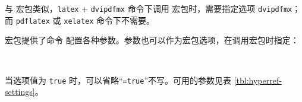 与  宏包类似，\texttt{latex} + \texttt{dvipdfmx} 命令下调用  宏包时，需要指定选项 \texttt{dvipdfmx}；
而 \texttt{pdflatex} 或 \texttt{xelatex} 命令下不需要。

 宏包提供了命令  配置各种参数。参数也可以作为宏包选项，在调用宏包时指定：
\begin{command}
 \\
\end{command}
当选项值为 \texttt{true} 时，可以省略“\texttt{=true}”不写。可用的参数见表 \ref{tbl:hyperref-settings}。

